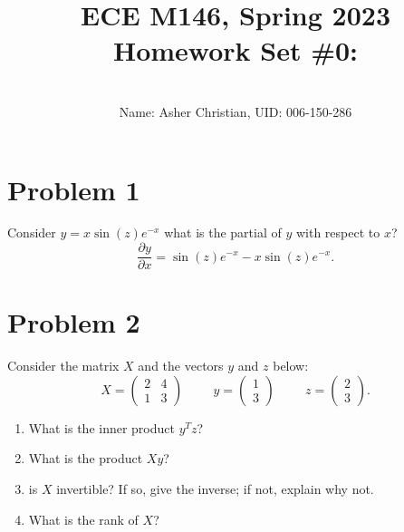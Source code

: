 \documentclass[11pt]{article}
\newcommand{\cnum}{ECE M146}
\newcommand{\ced}{Spring 2023}
\newcommand{\ctitle}[4]{\title{\vspace{-0.5in}\cnum, \ced\\Homework Set #1: #2}\author{\vspace{-0.35in}\\Name: #3, UID: #4}}
\newcommand{\solution}[1]{{{\color{blue}{\bf Solution:} {#1}}}}
\begin{document}
\ctitle{\#0}{}{Asher Christian}{006-150-286}
\date{}
\maketitle
\vspace{-0.75in}
\section{Problem 1}
Consider $y = x\sin(z)e^{-x}$ what is the partial of $y$ with respect to $x$?\\
\solution{
\[
    \frac{\partial y}{\partial x} = \sin(z)e^{-x} - x\sin(z)e^{-x}
.\] 
}

\section{Problem 2}
Consider the matrix $X$ and the vectors $y$ and $z$ below:
\[
    X = \begin{pmatrix} 2 & 4 \\ 1 & 3 \end{pmatrix} \hspace{1cm} y = \begin{pmatrix} 1 \\ 3 \end{pmatrix} \hspace{1cm} z = \begin{pmatrix} 2 \\ 3 \end{pmatrix} 
.\] 
\begin{enumerate}
    \item What is the inner product $y^{T}z$?
    \item What is the product $Xy$?
    \item is $X$ invertible? If so, give the inverse; if not, explain why not.
    \item What is the rank of $X$?
\end{enumerate}
\end{document}
